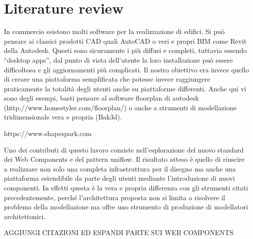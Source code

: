\section{Literature review}

In commercio esistono molti software per la realizzazione di edifici. Si pu\`o pensare ai classici prodotti CAD quali AutoCAD o veri e propri BIM come Revit della Autodesk. Questi sono sicuramente i pi\`u diffusi e completi, tuttavia essendo “desktop apps”, dal punto di vista dell'utente la loro installazione pu\`o essere difficoltosa e gli aggiornamenti pi\`u complicati. Il nostro obiettivo era invece quello di creare una piattaforma semplificata che potesse invece raggiungere praticamente la totalit\`a degli utenti anche su piattaforme differenti. Anche qui vi sono degli esempi, basti pensare al software floorplan di autodesk (http://www.homestyler.com/floorplan/) o anche a strumenti di modellazione tridimensionale vera e propria (Bak3d).

https://www.shapespark.com

Uno dei contributi di questo lavoro consiste nell'esplorazione del nuovo standard dei Web Components e del pattern uniflow. Il risultato atteso \`e quello di riuscire a realizzare non solo una completa infrastruttura per il disegno ma anche una piattaforma estendibile da parte degli utenti mediante l'introduzione di nuovi componenti. In effetti questa \`e la vera e propria differenza con gli strumenti citati precedentemente, perché l'architettura proposta non si limita a risolvere il problema della modellazione ma offre uno strumento di produzione di modellatori architettonici.


AGGIUNGI CITAZIONI ED ESPANDI PARTE SUI WEB COMPONENTS
